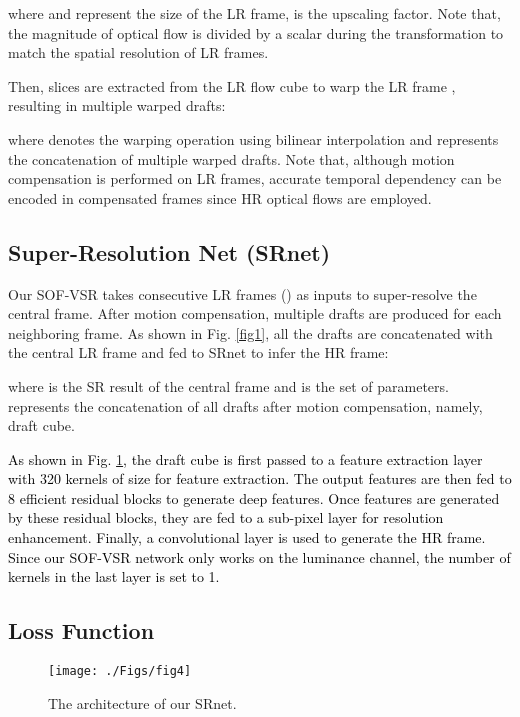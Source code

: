 \documentclass[journal]{IEEEtran}
\begin{document}
	where  and  represent the size of the LR frame,  is the upscaling factor. Note that, the magnitude of optical flow is divided by a scalar  during the transformation to match the spatial resolution of LR frames.
	
	Then, slices are extracted from the LR flow
	cube to warp the LR frame , resulting in multiple warped drafts:
	
	where  denotes the warping operation using bilinear interpolation and  represents
	the concatenation of multiple warped drafts. Note that, although motion compensation is performed on LR frames, accurate temporal dependency can be encoded in compensated frames since HR optical flows are employed.
	
	\subsection{Super-Resolution Net (SRnet)}
	
	Our SOF-VSR takes  consecutive LR frames () as inputs to super-resolve the central frame. After motion compensation, multiple drafts are produced for each neighboring frame. As shown in Fig. \ref{fig1}, all the drafts are concatenated with the central LR frame and fed to SRnet to infer the HR frame:
	
	where  is the SR result of the central frame and  is the set of parameters.  represents the concatenation of all drafts after motion compensation, namely, draft cube.
	
	
	\textcolor{black}{As shown in Fig. \ref{fig4}, the draft cube is first passed to a feature extraction layer with 320 kernels of size  for feature extraction. The output features are then fed to 8 efficient residual  blocks to generate deep features. Once features are generated by these residual blocks, they are fed to a sub-pixel layer for resolution enhancement. Finally, a  convolutional layer is used to generate the HR frame. Since our SOF-VSR network only works on the luminance channel, the number of kernels in the last layer is set to 1.}
	
	\subsection{Loss Function}
	
	\begin{figure}[bt]
		\centering
		\texttt{[image: ./Figs/fig4]}
		\caption{The architecture of our SRnet.}
		\label{fig4}
	\end{figure}
	
\end{document}
